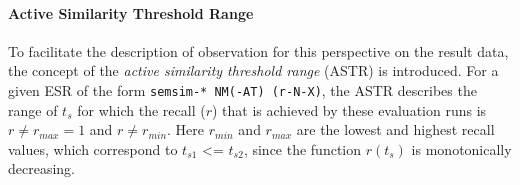 \documentclass[11pt]{scrreprt}
\begin{document}

\paragraph{Active Similarity Threshold Range}
To facilitate the description of observation for this perspective on the result data, the concept of the \textit{active similarity threshold range} (ASTR) is introduced. For a given ESR of the form \texttt{semsim-* NM(-AT) (r-N-X)}, the ASTR describes the range of \(t_s\) for which the recall (\(r\)) that is achieved by these evaluation runs is \(r \neq r_{max} = 1 \) and \(r \neq r_{min}\). Here \(r_{min}\) and \(r_{max}\) are the lowest and highest recall values, which correspond to \(t_{s1}\) <= \(t_{s2}\), since the function \(r(t_s)\) is monotonically decreasing.
\end{document}
